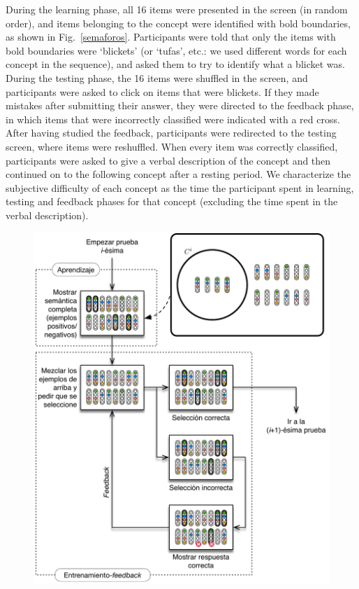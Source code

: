 During the learning phase, all 16 items were presented in the screen (in random order), and items belonging to the concept were identified with bold boundaries, as shown in  Fig.~\ref{semaforos}.
Participants were told that only the items with bold boundaries were `blickets' (or `tufas', etc.: we used different words for each concept in the sequence), and asked them to try to identify what a blicket was. During the testing phase, the 16 items were shuffled in the screen, and participants were asked to click on items that were blickets. If they made mistakes after submitting their answer, they were directed to the feedback phase, in which items that were incorrectly classified were indicated with a red cross. After having studied the feedback, participants were redirected to the testing screen, where items were reshuffled. When every item was correctly classified, participants were asked to give a verbal description of the concept and then continued on to the following concept after a resting period. We characterize the subjective difficulty of each concept as the time the participant spent in learning, testing and feedback phases for that concept (excluding the time spent in the verbal description).


\begin{figure}
\begin{center}
  \includegraphics[scale=1]{../figuras/pre/experimento_PRE.pdf}
\end{center}\caption{}
\end{figure}

